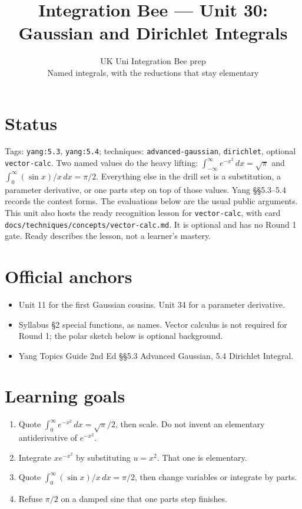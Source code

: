 
\title{Integration Bee --- Unit 30:\\ Gaussian and Dirichlet Integrals}
\author{UK Uni Integration Bee prep\\ Named integrals, with the reductions that stay elementary}
\date{}

\maketitle
\section*{Status}
Tags: \texttt{yang:5.3}, \texttt{yang:5.4}; techniques: \texttt{advanced-gaussian}, \texttt{dirichlet}, optional \texttt{vector-calc}.
Two named values do the heavy lifting: $\int_{-\infty}^{\infty}e^{-x^2}\,dx=\sqrt{\pi}$ and $\int_0^{\infty}(\sin x)/x\,dx=\pi/2$. Everything else in the drill set is a substitution, a parameter derivative, or one parts step on top of those values. Yang \S\S5.3--5.4 records the contest forms. The evaluations below are the usual public arguments.
This unit also hosts the ready recognition lesson for \texttt{vector-calc}, with card \texttt{docs/techniques/concepts/vector-calc.md}. It is optional and has no Round 1 gate. Ready describes the lesson, not a learner's mastery.
\section{Official anchors}
\begin{itemize}
\item Unit 11 for the first Gaussian cousins. Unit 34 for a parameter derivative.
\item Syllabus \S2 special functions, as names. Vector calculus is not required for Round 1; the polar sketch below is optional background.
\item Yang Topics Guide 2nd Ed \S\S5.3 Advanced Gaussian, 5.4 Dirichlet Integral.
\end{itemize}
\section{Learning goals}
\begin{enumerate}
  \item Quote $\int_0^{\infty}e^{-x^2}\,dx=\sqrt{\pi}/2$, then scale. Do not invent an elementary antiderivative of $e^{-x^2}$.
  \item Integrate $x e^{-x^2}$ by substituting $u=x^2$. That one is elementary.
  \item Quote $\int_0^{\infty}(\sin x)/x\,dx=\pi/2$, then change variables or integrate by parts.
  \item Refuse $\pi/2$ on a damped sine that one parts step finishes.
\end{enumerate}

